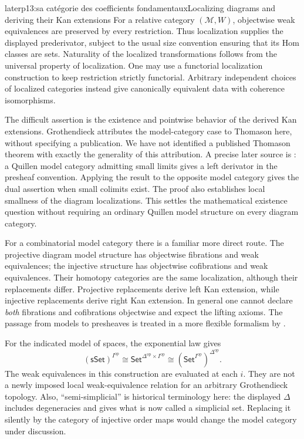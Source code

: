 \begin{dcomment}{later}{p13:sa catégorie des coefficients fondamentaux}{Localizing diagrams and deriving their Kan extensions}
For a relative category $(\mathcal M,W)$, objectwise weak equivalences are preserved by every restriction. Thus localization supplies the displayed prederivator, subject to the usual size convention ensuring that its Hom classes are sets. Naturality of the localized transformations follows from the universal property of localization. One may use a functorial localization construction to keep restriction strictly functorial. Arbitrary independent choices of localized categories instead give canonically equivalent data with coherence isomorphisms.

The difficult assertion is the existence and pointwise behavior of the derived Kan extensions. Grothendieck attributes the model-category case to Thomason here, without specifying a publication. We have not identified a published Thomason theorem with exactly the generality of this attribution. A precise later source is \citet[Theorem~6.11]{Cisinski2003}: a Quillen model category admitting small limits gives a left derivator in the presheaf convention. Applying the result to the opposite model category gives the dual assertion when small colimits exist. The proof also establishes local smallness of the diagram localizations. This settles the mathematical existence question without requiring an ordinary Quillen model structure on every diagram category.

For a combinatorial model category there is a familiar more direct route. The projective diagram model structure has objectwise fibrations and weak equivalences; the injective structure has objectwise cofibrations and weak equivalences. Their homotopy categories are the same localization, although their replacements differ. Projective replacements derive left Kan extension, while injective replacements derive right Kan extension. In general one cannot declare \emph{both} fibrations and cofibrations objectwise and expect the lifting axioms. The passage from models to presheaves is treated in a more flexible formalism by \citet[Theorem~6.22 and Corollary~6.24]{Cisinski2010}.

For the indicated model of spaces, the exponential law gives
\[
 (\mathsf{sSet})^{I^{\mathrm{op}}}
 \cong\mathsf{Set}^{\Delta^{\mathrm{op}}\times I^{\mathrm{op}}}
 \cong(\mathsf{Set}^{I^{\mathrm{op}}})^{\Delta^{\mathrm{op}}}.
\]
The weak equivalences in this construction are evaluated at each $i$. They are not a newly imposed local weak-equivalence relation for an arbitrary Grothendieck topology. Also, ``semi-simplicial'' is historical terminology here: the displayed $\Delta$ includes degeneracies and gives what is now called a simplicial set. Replacing it silently by the category of injective order maps would change the model category under discussion.
\end{dcomment}



